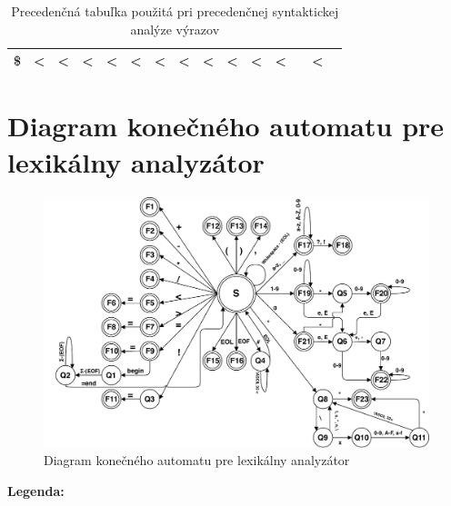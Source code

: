 \documentclass[a4paper, 11pt]{article}
\begin{document}
\begin{table}[!ht]
\begin{tabular}{|l|c|c|c|c|c|c|c|c|l|l|l|l|l|l|}
\textbf{\$}             & \multicolumn{1}{l|}{\textbf{\textless{}}}    & \multicolumn{1}{l|}{\textbf{\textless{}}}    & \multicolumn{1}{l|}{\textbf{\textless{}}}    & \multicolumn{1}{l|}{\textbf{\textless{}}}    & \multicolumn{1}{l|}{\textbf{\textless{}}}    & \multicolumn{1}{l|}{\textbf{\textless{}}}    & \multicolumn{1}{l|}{\textbf{\textless{}}}    & \multicolumn{1}{l|}{\textbf{\textless{}}}    & \textbf{\textless{}}    & \textbf{\textless{}}    & \textbf{\textless{}} & \textbf{}               & \textbf{\textless{}} & \textbf{}               \\ \hline
\end{tabular}
\caption{Precedenčná tabuľka použitá pri precedenčnej syntaktickej analýze výrazov}
\end{table}

\newpage
\section{Diagram konečného automatu pre lexikálny analyzátor}
\begin{figure}[!ht]
\centering
\includegraphics[width=1.0\linewidth]{automata/automata.pdf}
\caption{Diagram konečného automatu pre lexikálny analyzátor}
\label{obrazok:KA}
\end{figure}
\bigskip
\Large
\textbf{Legenda:}
\end{document}
